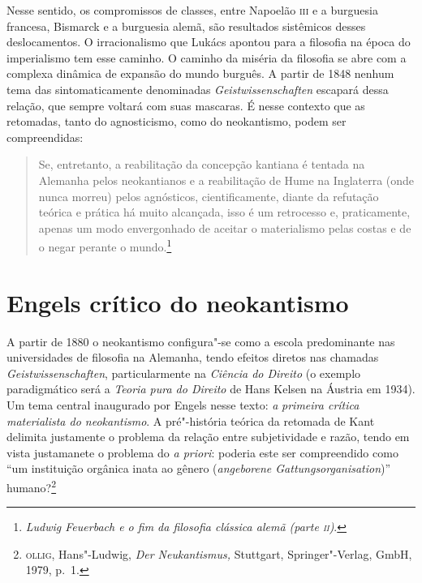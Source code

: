 Nesse sentido, os compromissos de classes, entre Napoelão \textsc{iii} e
a burguesia francesa, Bismarck e a burguesia alemã, são resultados
sistêmicos desses deslocamentos. O irracionalismo que Lukács apontou
para a filosofia na época do imperialismo tem esse caminho. O caminho da
miséria da filosofia se abre com a complexa dinâmica de expansão do
mundo burguês. A partir de 1848 nenhum tema das sintomaticamente
denominadas \emph{Geistwissenschaften} escapará dessa relação, que %
sempre voltará com suas mascaras. É nesse contexto que as retomadas,
tanto do agnosticismo, como do neokantismo, podem ser compreendidas:

\begin{quote}
Se, entretanto, a reabilitação da concepção kantiana é tentada na
Alemanha pelos neokantianos e a reabilitação de Hume na Inglaterra (onde
nunca morreu) pelos agnósticos, cientificamente, diante da refutação
teórica e prática há muito alcançada, isso é um retrocesso e,
praticamente, apenas um modo envergonhado de aceitar o materialismo
pelas costas e de o negar perante o mundo.\footnote{\emph{Ludwig
  Feuerbach e o fim da filosofia clássica alemã (parte \textsc{ii})}.}
\end{quote}

\section*{Engels crítico do neokantismo}

A partir de 1880 o neokantismo configura"-se como a escola predominante
nas universidades de filosofia na Alemanha, tendo efeitos diretos nas
chamadas \emph{Geistwissenschaften}, particularmente na \emph{Ciência do
Direito} (o exemplo paradigmático será a \emph{Teoria pura do Direito}
de Hans Kelsen na Áustria em 1934). Um tema central inaugurado por
Engels nesse texto: \emph{a} \emph{primeira crítica materialista do
neokantismo}. A pré"-história teórica da retomada de Kant delimita
justamente o problema da relação entre subjetividade e razão, tendo em
vista justamanete o problema do \emph{a priori}: poderia este ser
compreendido como ``um instituição orgânica inata ao gênero
(\emph{angeborene Gattungsorganisation})'' humano?\footnote{\textsc{ollig},
  Hans"-Ludwig, \emph{Der Neukantismus,} Stuttgart, Springer"-Verlag,
  GmbH, 1979, p.~1.}

